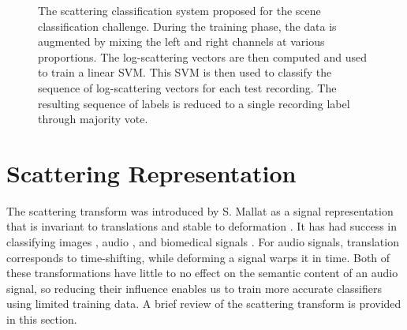 \documentclass{article}
\begin{document}
\begin{sloppy}
\begin{figure}
\begin{center}
\end{center}
\caption{
\label{fig:outline}
The scattering classification system proposed for the scene classification challenge. During the training phase, the data is augmented by mixing the left and right channels at various proportions. The log-scattering vectors are then computed and used to train a linear SVM. This SVM is then used to classify the sequence of log-scattering vectors for each test recording. The resulting sequence of labels is reduced to a single recording label through majority vote.
}
\end{figure}


\section{Scattering Representation}
\label{sec:scattering}

The scattering transform was introduced by S. Mallat as a signal representation that is invariant to translations and stable to deformation \cite{stephane}. It has had success in classifying images \cite{joan}, audio \cite{dss}, and biomedical signals \cite{embs}. For audio signals, translation corresponds to time-shifting, while deforming a signal warps it in time. Both of these transformations have little to no effect on the semantic content of an audio signal, so reducing their influence enables us to train more accurate classifiers using limited training data. A brief review of the scattering transform is provided in this section.


\end{sloppy}
\end{document}
